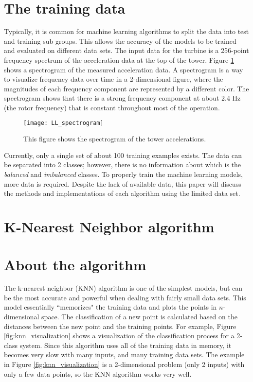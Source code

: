 \section{The training data}
Typically, it is common for machine learning algorithms to split the data into test and training sub groups.  This allows the accuracy of the models to be trained and evaluated on different data sets.  The input data for the turbine is a 256-point frequency spectrum of the acceleration data at the top of the tower.  Figure \ref{fig:LL_spectrogram} shows a spectrogram of the measured acceleration data.  A spectrogram is a way to visualize frequency data over time in a 2-dimensional figure, where the magnitudes of each frequency component are represented by a different color.  The spectrogram shows that there is a strong frequency component at about 2.4 Hz (the rotor frequency) that is constant throughout most of the operation.

\begin{figure}
	\centering
	\texttt{[image: LL\_spectrogram]}
	\decoRule
	\caption{This figure shows the spectrogram of the tower accelerations.}
	\label{fig:LL_spectrogram}
\end{figure}

Currently, only a single set of about 100 training examples exists.  The data can be separated into 2 classes; however, there is no information about which is the \textit{balanced} and \textit{imbalanced} classes.  To properly train the machine learning models, more data is required.  Despite the lack of available data, this paper will discuss the methods and implementations of each algorithm using the limited data set.


\section{K-Nearest Neighbor algorithm}
\section{About the algorithm}
The k-nearest neighbor (KNN) algorithm is one of the simplest models, but can be the most accurate and powerful when dealing with fairly small data sets.  This model essentially ``memorizes" the training data and plots the points in $n$-dimensional space.  The classification of a new point is calculated based on the distances between the new point and the training points.  For example, Figure \ref{fig:knn_visualization} shows a visualization of the classification process for a 2-class system.  Since this algorithm uses all of the training data in memory, it becomes very slow with many inputs, and many training data sets.  The example in Figure \ref{fig:knn_visualization} is a 2-dimensional problem (only 2 inputs) with only a few data points, so the KNN algorithm works very well.


